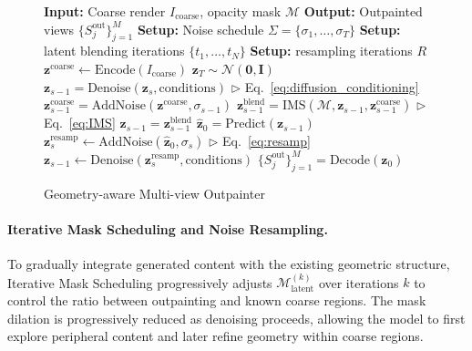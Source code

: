 \documentclass[runningheads]{llncs}
\begin{document}
\begin{figure}
    \begin{minipage}{\linewidth}
    \vspace{-40pt} 
    \begin{algorithm}[H]
        \caption{Geometry-aware Multi-view Outpainter}
        \label{alg:gamo}
        \scriptsize
        \begin{algorithmic}[1]
            \STATE \textbf{Input:} Coarse render $I_{\text{coarse}}$, opacity mask $\mathcal{M}$
            \STATE \textbf{Output:} Outpainted views $\{S_j^{\text{out}}\}_{j=1}^M$
            \STATE \textbf{Setup:} Noise schedule $\Sigma = \{\sigma_1, \ldots, \sigma_T\}$
            \STATE \textbf{Setup:} latent blending iterations $\{t_1, \ldots, t_N\}$
            \STATE \textbf{Setup:} resampling iterations $R$
            \STATE $\mathbf{z}^{\text{coarse}} \gets \text{Encode}(I_{\text{coarse}})$
            \STATE $\mathbf{z}_T \sim \mathcal{N}(\mathbf{0}, \mathbf{I})$
                \STATE $\mathbf{z}_{s-1} = \text{Denoise}(\mathbf{z}_s, \text{conditions})$ \hfill $\triangleright$ Eq.~\eqref{eq:diffusion_conditioning}
                    \STATE $\mathbf{z}_{s-1}^{\text{coarse}} = \text{AddNoise}(\mathbf{z}^{\text{coarse}}, \sigma_{s-1})$
                    \STATE $\mathbf{z}_{s-1}^{\text{blend}} = \text{IMS}(\mathcal{M}, \mathbf{z}_{s-1}, \mathbf{z}_{s-1}^{\text{coarse}})$ \hfill $\triangleright$ Eq.~\eqref{eq:IMS}
                    \STATE $\mathbf{z}_{s-1} = \mathbf{z}_{s-1}^{\text{blend}}$
                        \STATE $\hat{\mathbf{z}}_0 = \text{Predict}(\mathbf{z}_{s-1})$
                        \STATE $\mathbf{z}_s^{\text{resamp}} \gets \text{AddNoise}(\hat{\mathbf{z}}_0, \sigma_s)$ \hfill $\triangleright$ Eq.~\eqref{eq:resamp}
                        \STATE $\mathbf{z}_{s-1} \gets \text{Denoise}(\mathbf{z}_s^{\text{resamp}}, \text{conditions})$
                    \ENDFOR
                \ENDIF
            \ENDFOR
            \STATE $\{S_j^{\text{out}}\}_{j=1}^M = \text{Decode}(\mathbf{z}_0)$
        \end{algorithmic}
    \end{algorithm}
    \vspace{-40pt}
    \end{minipage}
\end{figure}

\paragraph{Iterative Mask Scheduling and Noise Resampling.}
\label{sec:IMS}
To gradually integrate generated content with the existing geometric structure, Iterative Mask Scheduling progressively adjusts $\mathcal{M}_{\text{latent}}^{(k)}$ over iterations $k$ to control the ratio between outpainting and known coarse regions. The mask dilation is progressively reduced as denoising proceeds, allowing the model to first explore peripheral content and later refine geometry within coarse regions.
\end{document}
